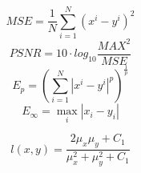 \begin{equation}
MSE= \frac{1}{N} \sum_{i=1}^N{(x^i-y^i)^2}
\end{equation}
\begin{equation}
PSNR= 10 \cdot log_{10}\frac{MAX^2}{MSE}
\end{equation}
\begin{equation}
E_p = ( \sum_{i=1}^N{|x^i-y^i|^p})^{\frac{1}{p}}
\end{equation}
\begin{equation}
E_\infty = \max_i{|x_i-y_i|}
\end{equation}

\begin{equation}
l(x, y) = \frac{2\mu_x \mu_y + C_1}{\mu_x^2 + \mu_y^2 + C_1}
\end{equation}